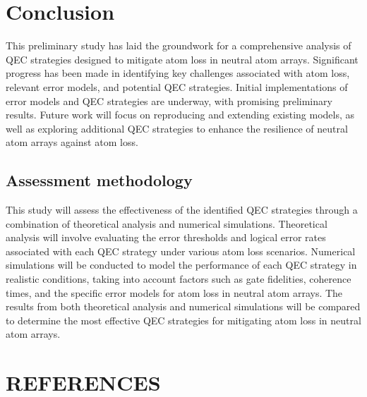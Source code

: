 \documentclass[aps,prb,twocolumn,superscriptaddress,nobibnotes]{revtex4-2} %
\begin{document}
\section{Conclusion}
This preliminary study has laid the groundwork for a comprehensive analysis of QEC strategies designed to mitigate atom loss in neutral atom arrays. 
Significant progress has been made in identifying key challenges associated with atom loss, relevant error models, and potential QEC strategies. 
Initial implementations of error models and QEC strategies are underway, with promising preliminary results.
Future work will focus on reproducing and extending existing models, as well as exploring additional QEC strategies to enhance the resilience of neutral atom arrays against atom loss.

\subsection{Assessment methodology}
This study will assess the effectiveness of the identified QEC strategies through a combination of theoretical analysis and numerical simulations.
Theoretical analysis will involve evaluating the error thresholds and logical error rates associated with each QEC strategy under various atom loss scenarios.
Numerical simulations will be conducted to model the performance of each QEC strategy in realistic conditions, taking into account factors such as gate fidelities, coherence times, and the specific error models for atom loss in neutral atom arrays.
The results from both theoretical analysis and numerical simulations will be compared to determine the most effective QEC strategies for mitigating atom loss in neutral atom arrays.

\section*{REFERENCES}
\makeatletter
\let\pre@bibdata\@empty
\makeatother
 
\end{document}
